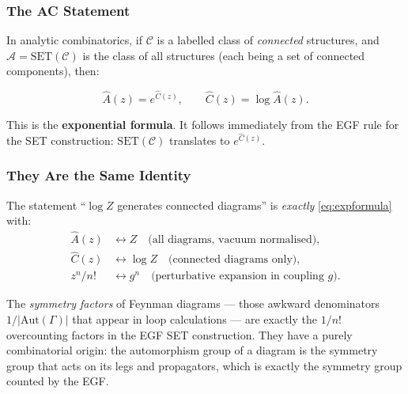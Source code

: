 \documentclass[11pt,a4paper]{article}
\theoremstyle{definition}
\begin{document}
\subsubsection{The AC Statement}

In analytic combinatorics, if $\mathcal{C}$ is a labelled class of
\emph{connected} structures, and $\mathcal{A} = \mathrm{SET}(\mathcal{C})$
is the class of all structures (each being a set of connected components), then:

\begin{equation}
  \hat{A}(z) = e^{\hat{C}(z)}, \qquad \hat{C}(z) = \log \hat{A}(z).
  \label{eq:expformula}
\end{equation}

This is the \textbf{exponential formula}. It follows immediately from the
EGF rule for the SET construction: $\mathrm{SET}(\mathcal{C})$ translates
to $e^{\hat{C}(z)}$.

\subsubsection{They Are the Same Identity}

The statement ``$\log Z$ generates connected diagrams'' is
\emph{exactly} \eqref{eq:expformula} with:
\begin{align*}
  \hat{A}(z) &\leftrightarrow Z \quad \text{(all diagrams, vacuum normalised)}, \\
  \hat{C}(z) &\leftrightarrow \log Z \quad \text{(connected diagrams only)}, \\
  z^n/n!     &\leftrightarrow g^n \quad \text{(perturbative expansion in coupling $g$)}.
\end{align*}

The \emph{symmetry factors} of Feynman diagrams --- those awkward denominators
$1/|\mathrm{Aut}(\Gamma)|$ that appear in loop calculations --- are exactly the
$1/n!$ overcounting factors in the EGF SET construction. They have a purely
combinatorial origin: the automorphism group of a diagram is the symmetry group
that acts on its legs and propagators, which is exactly the symmetry group
counted by the EGF.
\end{document}
